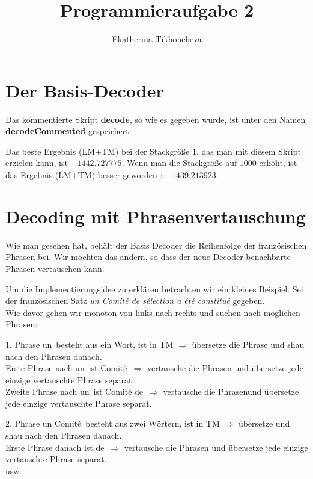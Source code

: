 \documentclass[11pt,a4paper]{scrartcl}
\begin{document}
\title{Programmieraufgabe 2}
\author{Ekatherina Tikhoncheva}
\maketitle

\section{Der Basis-Decoder}

Das kommentierte Skript {\bf decode}, so wie es gegeben wurde, ist unter den Namen {\bf decodeCommented} gespeichert.
 
Das beste Ergebnis (LM+TM) bei der Stackgröße $1$, das man mit diesem Skript erzielen kann, ist $-1442.727775$.
Wenn man die Stackgröße auf $1000$ erhöht, ist das Ergebnis (LM+TM) besser geworden : $-1439.213923$.

\section{Decoding mit Phrasenvertauschung}

Wie man gesehen hat, behält der Basis Decoder die Reihenfolge der französischen Phrasen bei. Wir möchten das ändern, so dass der neue Decoder benachbarte Phrasen vertauschen kann. 

\vspace{10pt}
Um die Implementierungsidee zu erklären betrachten wir ein kleines Beispiel. Sei der französischen Satz {\it un Comité de sélection a été constitué} gegeben. \\
Wie davor gehen wir monoton von links nach rechts und suchen nach möglichen Phrasen:

\vspace{7pt}
1. Phrase \glqq un\grqq\ besteht aus ein Wort, ist in TM $\Rightarrow$ übersetze die Phrase und shau nach den Phrasen danach.\\
Erste Phrase nach \glqq un\grqq\  ist  \glqq Comité\grqq\  $\Rightarrow$  vertausche die Phrasen und übersetze jede einzige vertauschte Phrase separat.\\
Zweite Phrase nach \glqq un\grqq\  ist  \glqq Comité de\grqq\  $\Rightarrow$  vertausche die Phrasenund übersetze jede einzige vertauschte Phrase separat.

\vspace{7pt}
2. Phrase \glqq un Comité\grqq\ besteht aus zwei Wörtern, ist in TM $\Rightarrow$ übersetze und shau nach den Phrasen danach.\\
Erste Phrase danach ist \glqq de\grqq\  $\Rightarrow$  vertausche die Phrasen und übersetze jede einzige vertauschte Phrase separat. \\
usw.
\end{document}
